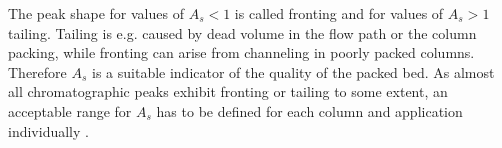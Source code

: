 The peak shape for values of $A_{s} < 1$ is called fronting and for values of $A_{s} > 1$ tailing. Tailing is e.g. caused by dead volume in the flow path or the column packing, while fronting can arise from channeling in poorly packed columns. Therefore $A_{s}$ is a suitable indicator of the quality of the packed bed. As almost all chromatographic peaks exhibit fronting or tailing to some extent, an acceptable range for $A_{s}$ has to be defined for each column and application individually \cite{SWB-414874366}.  
\FloatBarrier
% 
% 
% 
